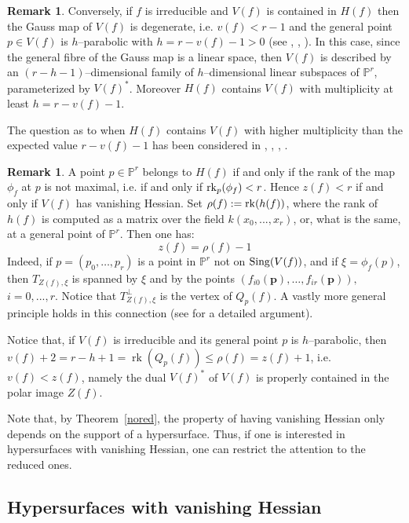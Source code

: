 \documentclass[11pt]{article}   %
\theoremstyle{definition}
\newtheorem{Remark}[Theorem]{Remark}
\numberwithin{Theorem}{section} \numberwithin{equation}{section}
\newcommand{\Proj}{{\mathbb P}}
\newcommand{\p}{{\mathbb P}}
\newcommand{\rk}{\operatorname{rk}}
\begin{document}
{\begin{Remark}
Conversely, if $f$ is irreducible and $V(f)$ is contained in $H(f)$
then the Gauss map of $V(f)$ is degenerate, i.e. $v(f)<r-1$ and the
general point $p\in V(f)$ is $h$--parabolic with $h=r-v(f)-1>0$ (see
\cite[4--5]{Seg},  \cite{Segre}, \cite{Ciliberto}). In this case,
since the general fibre of the Gauss map is a linear space, then
$V(f)$ is described by an $(r-h-1)$--dimensional family of
$h$--dimensional linear subspaces
 of $\Proj^ r$, parameterized by $V(f)^*$.
 Moreover $H(f)$  contains  $V(f)$ with multiplicity at least $h=r-v(f)-1$.

The question as to when  $H(f)$  contains  $V(f)$ with higher
multiplicity than the expected value $r-v(f)-1$ has been considered
in \cite {Segre}, \cite{Segre2}, \cite{Fr1}, \cite{Ciliberto}.
\end{Remark}


\begin{Remark}\label{hessim} A point $p\in \p^r$ belongs to $H(f)$ if
and only if the rank of the map $\phi_f$ at $p$ is not maximal, i.e.
if and only if ${\rm rk}_p(\phi_f)<r$. Hence $z(f)<r$ if and only if
$V(f)$ has vanishing Hessian. Set $\rho(f):={\rm rk}(h(f))$,  where
the rank of $h(f)$ is computed as a matrix over the field
$k(x_0,...,x_r)$, or, what is the same, at a general point of
$\Proj^ r$. Then one has:
$$z(f)=\rho(f)-1$$
Indeed, if $p=(p_0,\ldots,p_r)$ is a point in $\Proj^r$ not on ${\rm
Sing} (V(f))$, and if $\xi=\phi_f(p)$, then $T_{Z(f),\xi}$ is
spanned by $\xi$ and by the points $(f_{i0}(\mathbf{p}),\ldots,
f_{ir}(\mathbf{p})),$ $ i=0,...,r$.
Notice that $T_{Z(f),\xi}^ \perp$ is the vertex of $Q_p(f)$.
A vastly more general principle
holds in this connection (see \cite[Proposition 1.1]{Simis} for a
detailed argument).

Notice that, if $V(f)$ is irreducible and its general point $p$ is $h$--parabolic,
then $v(f)+2=r-h+1=\rk(Q_p(f))\leq \rho(f)=z(f)+1$, i.e. $v(f)<z(f)$,
namely the dual $V(f)^ *$  of $V(f)$ is properly contained in the
polar image $Z(f)$.


Note that, by Theorem~\ref{nored}, the property of having vanishing
Hessian only depends on the support of a hypersurface. Thus, if one
is interested in hypersurfaces with vanishing Hessian, one can
restrict the attention to the reduced ones.
\end{Remark}



\subsection{Hypersurfaces with vanishing Hessian}\label{hess}



}
\end{document}

